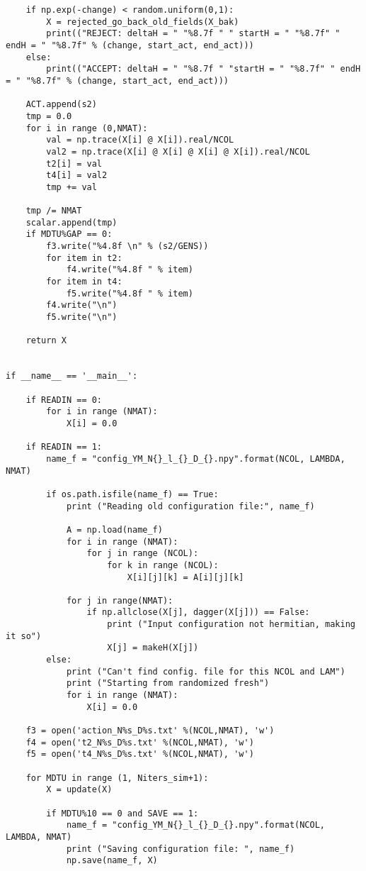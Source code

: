 \begin{lstlisting}
    if np.exp(-change) < random.uniform(0,1):
        X = rejected_go_back_old_fields(X_bak)
        print(("REJECT: deltaH = " "%8.7f " " startH = " "%8.7f" " endH = " "%8.7f" % (change, start_act, end_act)))
    else:   
        print(("ACCEPT: deltaH = " "%8.7f " "startH = " "%8.7f" " endH = " "%8.7f" % (change, start_act, end_act)))

    ACT.append(s2)
    tmp = 0.0 
    for i in range (0,NMAT):
        val = np.trace(X[i] @ X[i]).real/NCOL
        val2 = np.trace(X[i] @ X[i] @ X[i] @ X[i]).real/NCOL
        t2[i] = val 
        t4[i] = val2 
        tmp += val 

    tmp /= NMAT 
    scalar.append(tmp) 
    if MDTU%GAP == 0:
        f3.write("%4.8f \n" % (s2/GENS))
        for item in t2:
            f4.write("%4.8f " % item)
        for item in t4:
            f5.write("%4.8f " % item)
        f4.write("\n")
        f5.write("\n") 

    return X


if __name__ == '__main__':

    if READIN == 0:
        for i in range (NMAT):  
            X[i] = 0.0  

    if READIN == 1:
        name_f = "config_YM_N{}_l_{}_D_{}.npy".format(NCOL, LAMBDA, NMAT)

        if os.path.isfile(name_f) == True: 
            print ("Reading old configuration file:", name_f)
            
            A = np.load(name_f)
            for i in range (NMAT):
                for j in range (NCOL):
                    for k in range (NCOL):
                        X[i][j][k] = A[i][j][k] 

            for j in range(NMAT):
                if np.allclose(X[j], dagger(X[j])) == False:
                    print ("Input configuration not hermitian, making it so")
                    X[j] = makeH(X[j])
        else: 
            print ("Can't find config. file for this NCOL and LAM")
            print ("Starting from randomized fresh")
            for i in range (NMAT):  
                X[i] = 0.0

    f3 = open('action_N%s_D%s.txt' %(NCOL,NMAT), 'w')
    f4 = open('t2_N%s_D%s.txt' %(NCOL,NMAT), 'w')
    f5 = open('t4_N%s_D%s.txt' %(NCOL,NMAT), 'w')

    for MDTU in range (1, Niters_sim+1): 
        X = update(X)

        if MDTU%10 == 0 and SAVE == 1:
            name_f = "config_YM_N{}_l_{}_D_{}.npy".format(NCOL, LAMBDA, NMAT)
            print ("Saving configuration file: ", name_f)
            np.save(name_f, X)


\end{lstlisting}
